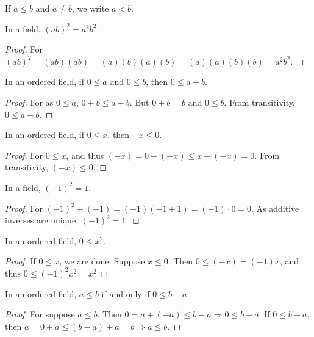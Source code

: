 \documentclass[crop=false,class=book,oneside]{standalone}
\begin{document}
            \begin{remark}
            If $a\leq b$ and $a\ne b$, we write $a<b$.
            \end{remark}
            \begin{theorem}
            In a field, $(ab)^2 = a^2b^2$.
            \end{theorem}
            \begin{proof}
            For $(ab)^2 = (ab)(ab)=(a)(b)(a)(b)= (a)(a)(b)(b)=a^2b^2$.
            \end{proof}
            \begin{theorem} In an ordered field, if $0\leq a$ and $0\leq b$, then $0\leq a+b$.
            \end{theorem}
            \begin{proof}
            For as $0\leq a$, $0+b\leq a+b$. But $0+b = b$ and $0\leq b$. From transitivity, $0\leq a+b$.
            \end{proof}
            \begin{theorem}
            In an ordered field, if $0\leq x$, then $-x\leq 0$.
            \end{theorem}
            \begin{proof}
            For $0\leq x$, and thus $(-x)=0+(-x)\leq x+(-x) =0$. From transitivity, $(-x)\leq 0$.
            \end{proof}
            \begin{theorem}
            In a field, $(-1)^2 = 1$.
            \end{theorem}
            \begin{proof}
            For $(-1)^2 +(-1) = (-1)(-1+1) = (-1)\cdot 0 = 0$. As additive inverses are unique, $(-1)^2 = 1$.
            \end{proof}
            \begin{theorem}
            In an ordered field, $0\leq x^2$.
            \end{theorem}
            \begin{proof}
            If $0 \leq x$, we are done. Suppose $x\leq 0$. Then $0\leq (-x) = (-1)x$, and thus $0\leq (-1)^2 x^2=x^2$
            \end{proof}
            \begin{theorem}
            In an ordered field, $a\leq b$ if and only if $0 \leq b-a$
            \end{theorem}
            \begin{proof}
            For suppose $a\leq b$. Then $0=a+(-a)\leq b-a\Rightarrow 0 \leq b-a$. If $0\leq b-a$, then $a=0+a \leq (b-a)+a = b\Rightarrow a\leq b$.
            \end{proof}
\end{document}
